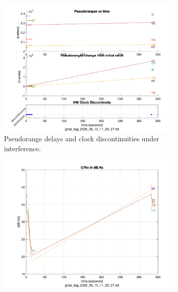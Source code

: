         \begin{figure}[h!]
            \centering
            \begin{subfigure}{0.23\textwidth}
                \includegraphics[width=\textwidth]{images/tests/Monte_Cappuccini/Interferences/Samsung_A51_Monte_Cappuccini_interference_fig1.png}
                \caption{Pseudorange delays and clock discontinuities under interference.}
                \label{fig:interference_pr}
            \end{subfigure}
            \hfill
            \begin{subfigure}{0.23\textwidth}
                \includegraphics[width=\textwidth]{images/tests/Monte_Cappuccini/Interferences/Samsung_A51_Monte_Cappuccini_interference_fig3.png}

\end{subfigure}
\end{figure}
